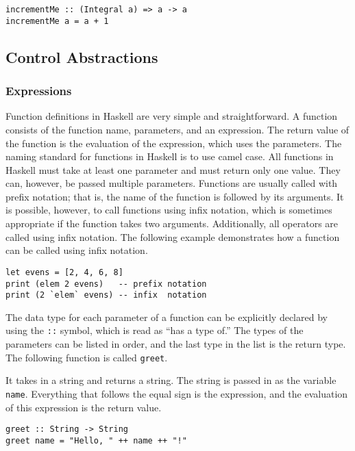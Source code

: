 \documentclass[titlepage,12pt]{article}
\begin{document}
\begin{verbatim}
incrementMe :: (Integral a) => a -> a
incrementMe a = a + 1
\end{verbatim}

\subsection{Control Abstractions}
\subsubsection{Expressions}

Function definitions in Haskell are very simple and straightforward. A function consists of the function name, 
parameters, and an expression. The return value of the function is the evaluation of the expression, which 
uses the parameters. The naming standard for functions in Haskell is to use camel case. All functions in 
Haskell must take at least one parameter and must return only one value. They can, however, be passed 
multiple parameters. Functions are usually called with prefix notation; that is, the name of the function is 
followed by its arguments. It is possible, however, to call functions using infix notation, which is sometimes appropriate 
if the function takes two arguments. Additionally, all operators are called using infix notation. The following example 
demonstrates how a function can be called using infix notation. 

\begin{verbatim}
let evens = [2, 4, 6, 8]
print (elem 2 evens)   -- prefix notation
print (2 `elem` evens) -- infix  notation
\end{verbatim}

The data type for each parameter of a function can be explicitly declared by using the \texttt{::} symbol, which is 
read as ``has a type of.''  The types of the parameters can be listed in order, and the last type in the list 
is the return type. The following function is called \texttt{greet}.

It takes in a string and returns a string. The string is passed in as the variable \texttt{name}. Everything that follows 
the equal sign is the expression, and the evaluation of this expression is the return value. 

\begin{verbatim}
greet :: String -> String
greet name = "Hello, " ++ name ++ "!"
\end{verbatim}
\end{document}
